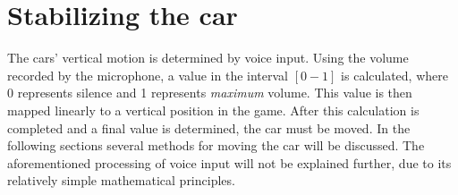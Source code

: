 \section{Stabilizing the car}
The cars' vertical motion is determined by voice input.
Using the volume recorded by the microphone, a value in the interval $[0-1]$ is calculated, where 0 represents silence and 1 represents \textit{maximum} volume.
This value is then mapped linearly to a vertical position in the game.
After this calculation is completed and a final value is determined, the car must be moved.
In the following sections several methods for moving the car will be discussed.
The aforementioned processing of voice input will not be explained further, due to its relatively simple mathematical principles.
